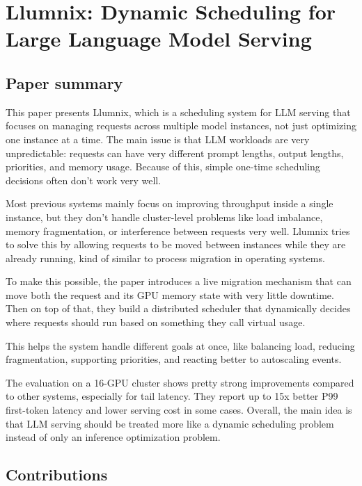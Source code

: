 \documentclass[a4paper, 12pt]{article}
\begin{document}
\section*{Llumnix: Dynamic Scheduling for\\Large Language Model Serving}
\subsection{Paper summary}

This paper presents Llumnix, which is a scheduling system for LLM serving that focuses on managing requests across multiple model instances, not just optimizing one instance at a time. The main issue is that LLM workloads are very unpredictable: requests can have very different prompt lengths, output lengths, priorities, and memory usage. Because of this, simple one-time scheduling decisions often don’t work very well.

Most previous systems mainly focus on improving throughput inside a single instance, but they don’t handle cluster-level problems like load imbalance, memory fragmentation, or interference between requests very well. Llumnix tries to solve this by allowing requests to be moved between instances while they are already running, kind of similar to process migration in operating systems.

To make this possible, the paper introduces a live migration mechanism that can move both the request and its GPU memory state with very little downtime. Then on top of that, they build a distributed scheduler that dynamically decides where requests should run based on something they call virtual usage.

This helps the system handle different goals at once, like balancing load, reducing fragmentation, supporting priorities, and reacting better to autoscaling events.

The evaluation on a 16-GPU cluster shows pretty strong improvements compared to other systems, especially for tail latency. They report up to 15x better P99 first-token latency and lower serving cost in some cases. Overall, the main idea is that LLM serving should be treated more like a dynamic scheduling problem instead of only an inference optimization problem.

\subsection{Contributions}
\end{document}
